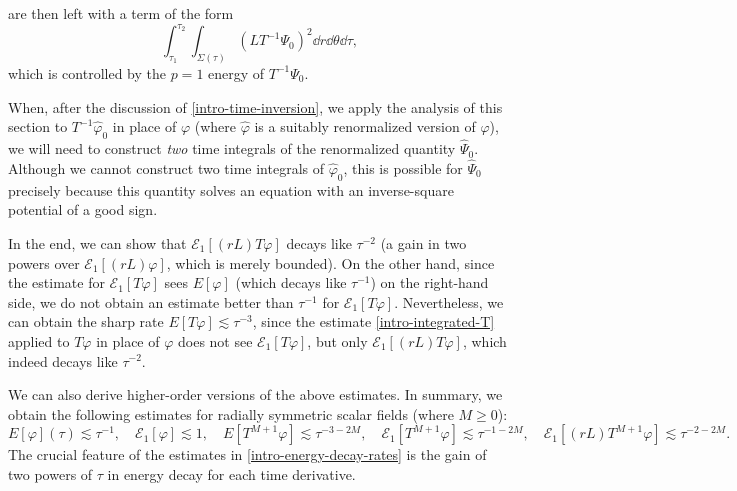 \documentclass[10pt, reqno]{amsart}
\begin{document}
are then left with a term of the form
\begin{equation}\label{intro-L-Tinv-Psi}
\int_{\tau_1}^{\tau_2} \int _{\Sigma{}(\tau{})} (LT^{-1}\Psi{}_0)^2\dd{}r\dd{}\theta{}\dd{}\tau{},
\end{equation}
which is controlled by the \(p = 1\) energy of \(T^{-1}\Psi_0\).
\begin{remark}
When, after the discussion of \cref{intro-time-inversion}, we apply the analysis of
this section to \(T^{-1}\widehat{\varphi{}}_0\) in place of \(\varphi{}\) (where
\(\widehat{\varphi{}}\) is a suitably renormalized version of \(\varphi{}\)), we
will need to construct \emph{two} time integrals of the renormalized quantity
\(\widehat{\Psi{}}_0\). Although we cannot construct two time integrals of
\(\widehat{\varphi{}}_0\), this is possible for \(\widehat{\Psi{}}_0\) precisely
because this quantity solves an equation with an inverse-square potential of a
good sign.
\end{remark}
In the end, we can show that \(\mathcal{E}_1[(rL)T\varphi{}]\) decays like \(\tau^{-2}\)
(a gain in two powers over \(\mathcal{E}_1[(rL)\varphi{}]\), which is merely
bounded). On the other hand, since the estimate for
\(\mathcal{E}_1[T\varphi{}]\) sees \(E[\varphi{}]\) (which decays like
\(\tau^{-1}\)) on the right-hand side, we do not obtain an estimate better than
\(\tau^{-1}\) for \(\mathcal{E}_1[T\varphi{}]\). Nevertheless, we can
obtain the sharp rate \(E[T\varphi{}]\lesssim \tau^{-3}\), since the estimate
\cref{intro-integrated-T} applied to \(T\varphi{}\) in place of \(\varphi{}\) does
not see \(\mathcal{E}_1[T\varphi{}]\), but only
\(\mathcal{E}_1[(rL)T\varphi{}]\), which indeed decays like \(\tau^{-2}\).

We can also derive higher-order versions of the above estimates. In summary, we
obtain the following estimates for radially symmetric scalar fields (where \(M\ge 0\)):
\begin{equation}\label{intro-energy-decay-rates}
E[\varphi{}](\tau{})\lesssim \tau^{-1},\quad \mathcal{E}_1[\varphi{}]\lesssim 1,\quad E[T^{M+1}\varphi{}]\lesssim \tau^{-3-2M},\quad  \mathcal{E}_1[T^{M+1}\varphi{}]\lesssim \tau^{-1-2M},\quad \mathcal{E}_1[(rL)T^{M+1}\varphi{}]\lesssim \tau^{-2-2M}.
\end{equation}
The crucial feature of the estimates in \cref{intro-energy-decay-rates} is the gain
of two powers of \(\tau{}\) in energy decay for each time derivative.
\end{document}
